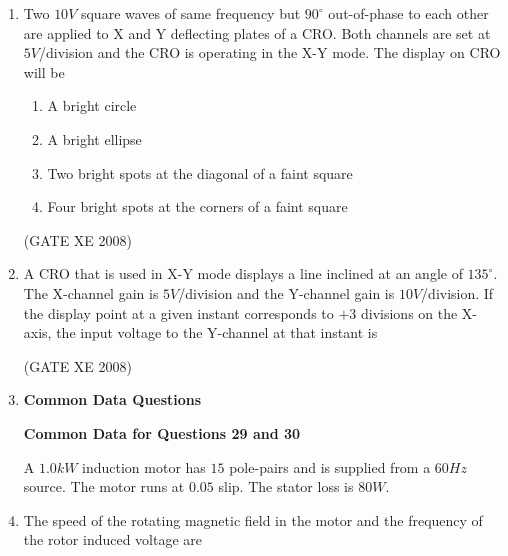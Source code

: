 \documentclass[12pt]{article}
\begin{document}
\begin{enumerate}
(GATE XE 2008)
\item  Two $10 V$ square waves of same frequency but $90^{\circ}$ out-of-phase to each other are applied to X and Y deflecting plates of a CRO. Both channels are set at $5 V$/division and the CRO is operating in the X-Y mode. The display on CRO will be

\begin{enumerate}

\item  A bright circle

\item  A bright ellipse

\item  Two bright spots at the diagonal of a faint square

\item  Four bright spots at the corners of a faint square
\end{enumerate}

(GATE XE 2008)
\item  A CRO that is used in X-Y mode displays a line inclined at an angle of $135^{\circ}$. The X-channel gain is $5V$/division and the Y-channel gain is $10V$/division. If the display point at a given instant corresponds to $+ 3$ divisions on the X-axis, the input voltage to the Y-channel at that instant is

\begin{enumerate}
\end{enumerate}

(GATE XE 2008)
\item[]\textbf{\Large Common Data Questions}

\textbf{Common Data for Questions 29 and 30}

A $1.0 kW$ induction motor has $15$ pole-pairs and is supplied from a $60 Hz$ source. The motor runs at $0.05$ slip. The stator loss is $80 W$.

\item  The speed of the rotating magnetic field in the motor and the frequency of the rotor induced voltage are

\begin{enumerate}
\end{enumerate}


\end{enumerate}
\end{document}
